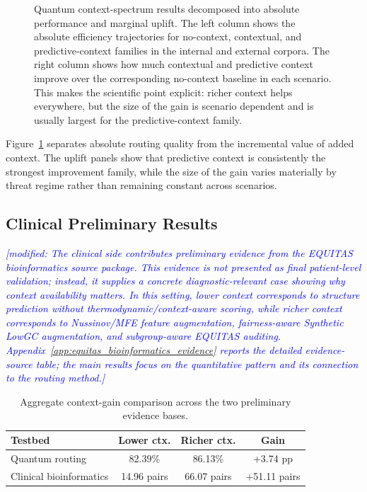\documentclass[conference]{IEEEtran}
\newcommand{\modified}[1]{\textcolor{blue}{{\it [modified: #1]}}}
\begin{document}
\begin{figure}[t]
\caption{Quantum context-spectrum results decomposed into absolute performance and marginal uplift. The left column shows the absolute efficiency trajectories for no-context, contextual, and predictive-context families in the internal and external corpora. The right column shows how much contextual and predictive context improve over the corresponding no-context baseline in each scenario. This makes the scientific point explicit: richer context helps everywhere, but the size of the gain is scenario dependent and is usually largest for the predictive-context family.}
\label{fig:context_spectrum}
\end{figure}

Figure~\ref{fig:context_spectrum} separates absolute routing quality from the incremental value of added context. The uplift panels show that predictive context is consistently the strongest improvement family, while the size of the gain varies materially by threat regime rather than remaining constant across scenarios.

\subsection{Clinical Preliminary Results}
\modified{The clinical side contributes preliminary evidence from the EQUITAS
bioinformatics source package. This evidence is not presented as final
patient-level validation; instead, it supplies a concrete diagnostic-relevant
case showing why context availability matters. In this setting, lower context
corresponds to structure prediction without thermodynamic/context-aware scoring,
while richer context corresponds to Nussinov/MFE feature augmentation,
fairness-aware Synthetic LowGC augmentation, and subgroup-aware EQUITAS auditing.
Appendix~\ref{app:equitas_bioinformatics_evidence} reports the detailed
evidence-source table; the main results focus on the quantitative pattern and
its connection to the routing method.}

\begin{table}[t]
\caption{Aggregate context-gain comparison across the two preliminary evidence bases.}
\label{tab:cross_testbed_context_gain}
\centering
\small
\setlength{\tabcolsep}{4pt}
\begin{tabular}{p{}ccc}
\toprule
\textbf{Testbed} & \textbf{Lower ctx.} & \textbf{Richer ctx.} & \textbf{Gain} \\
\midrule
Quantum routing & 82.39\% & 86.13\% & +3.74 pp \\
Clinical bioinformatics & 14.96 pairs & 66.07 pairs & +51.11 pairs \\
\bottomrule
\end{tabular}
\end{table}
\end{document}
